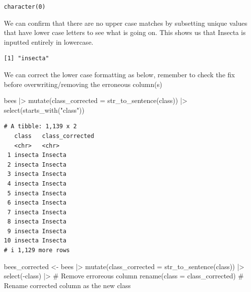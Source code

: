 \documentclass[
  letterpaper,
  DIV=11,
  numbers=noendperiod,
  oneside]{scrreprt}
\newenvironment{Shaded}{\begin{snugshade}}{\end{snugshade}}
\newcommand{\AttributeTok}[1]{\textcolor[rgb]{0.40,0.45,0.13}{#1}}
\newcommand{\CommentTok}[1]{\textcolor[rgb]{0.37,0.37,0.37}{#1}}
\newcommand{\FunctionTok}[1]{\textcolor[rgb]{0.28,0.35,0.67}{#1}}
\newcommand{\NormalTok}[1]{\textcolor[rgb]{0.00,0.23,0.31}{#1}}
\newcommand{\OtherTok}[1]{\textcolor[rgb]{0.00,0.23,0.31}{#1}}
\newcommand{\SpecialCharTok}[1]{\textcolor[rgb]{0.37,0.37,0.37}{#1}}
\newcommand{\StringTok}[1]{\textcolor[rgb]{0.13,0.47,0.30}{#1}}
\begin{document}
\begin{verbatim}
character(0)
\end{verbatim}

We can confirm that there are no upper case matches by subsetting unique
values that have lower case letters to see what is going on. This shows
us that Insecta is inputted entirely in lowercase.

\begin{Shaded}
\end{Shaded}

\begin{verbatim}
[1] "insecta"
\end{verbatim}

We can correct the lower case formatting as below, remember to check the
fix before overwriting/removing the erroneous column(s)

\begin{Shaded}
\begin{Highlighting}[]
\NormalTok{bees }\SpecialCharTok{|\textgreater{}} 
  \FunctionTok{mutate}\NormalTok{(}\AttributeTok{class\_corrected =} \FunctionTok{str\_to\_sentence}\NormalTok{(class)) }\SpecialCharTok{|\textgreater{}}
  \FunctionTok{select}\NormalTok{(}\FunctionTok{starts\_with}\NormalTok{(}\StringTok{"class"}\NormalTok{))}
\end{Highlighting}
\end{Shaded}

\begin{verbatim}
# A tibble: 1,139 x 2
   class   class_corrected
   <chr>   <chr>          
 1 insecta Insecta        
 2 insecta Insecta        
 3 insecta Insecta        
 4 insecta Insecta        
 5 insecta Insecta        
 6 insecta Insecta        
 7 insecta Insecta        
 8 insecta Insecta        
 9 insecta Insecta        
10 insecta Insecta        
# i 1,129 more rows
\end{verbatim}

\begin{Shaded}
\begin{Highlighting}[]
\NormalTok{bees\_corrected }\OtherTok{\textless{}{-}}\NormalTok{ bees }\SpecialCharTok{|\textgreater{}} 
  \FunctionTok{mutate}\NormalTok{(}\AttributeTok{class\_corrected =} \FunctionTok{str\_to\_sentence}\NormalTok{(class)) }\SpecialCharTok{|\textgreater{}} 
  \FunctionTok{select}\NormalTok{(}\SpecialCharTok{{-}}\NormalTok{class) }\SpecialCharTok{|\textgreater{}} \CommentTok{\# Remove erroreous column }
  \FunctionTok{rename}\NormalTok{(}\AttributeTok{class =}\NormalTok{ class\_corrected) }\CommentTok{\# Rename corrected column as the new \textquotesingle{}class\textquotesingle{}}
\end{Highlighting}
\end{Shaded}
\end{document}
